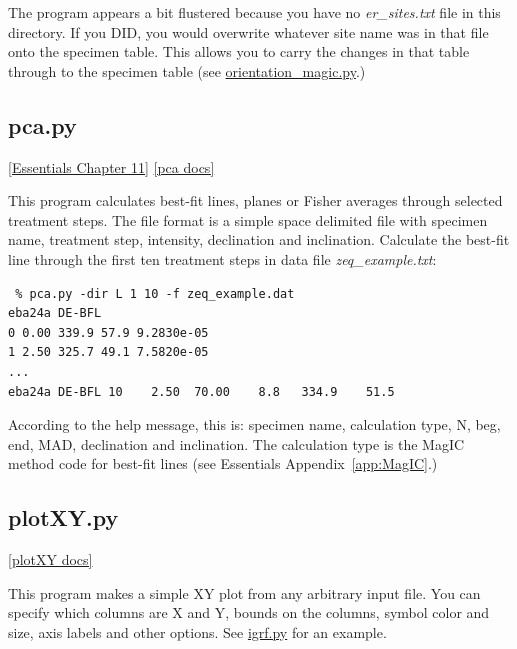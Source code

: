 \documentclass[11pt]{book}
\begin{document}
{{{The program appears a bit flustered because you have no {\it er\_sites.txt} file in this directory.  If you DID, you would overwrite whatever site name was in that file onto the specimen table.  This allows you to carry the changes in that table through to the specimen table (see \href{#orientation_magic.py}{orientation\_magic.py}.)    


%
\subsection{pca.py} 
\href{http://magician.ucsd.edu/Essentials_2/WebBook2ch11.html#ch11}{[Essentials Chapter 11]}
\href{http://earthref.org/PmagPy/pmagpydocs/pca-module.html}{[pca docs]}

This program calculates best-fit lines, planes or Fisher averages through selected treatment steps.  The file format is 
a simple space delimited file with specimen name, treatment step,  intensity, declination and inclination.  Calculate the best-fit 
line through the first ten treatment steps in data file {\it zeq\_example.txt}:  
  
 \begin{verbatim}
 % pca.py -dir L 1 10 -f zeq_example.dat
eba24a DE-BFL
0 0.00 339.9 57.9 9.2830e-05
1 2.50 325.7 49.1 7.5820e-05
...
eba24a DE-BFL 10    2.50  70.00    8.8   334.9    51.5
\end{verbatim}
 
 According to the help message, this is: specimen name, calculation type, N, beg, end, MAD, declination and inclination.   The calculation type is the MagIC method code for best-fit lines (see Essentials Appendix~\ref{app:MagIC}.)
 

%  
%  
  
  \subsection{plotXY.py}
  \href{http://earthref.org/PmagPy/pmagpydocs/plotXY-module.html}{[plotXY docs]}
  
This program makes a simple XY plot from any arbitrary input file.  You can specify which columns are X and Y, bounds on the columns, symbol color and size, axis labels and other options.  See \href{#igrf.py}{igrf.py} for an example.     
  
}}}
\end{document}
